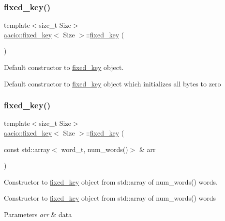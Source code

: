 \subsubsection{\texorpdfstring{fixed\+\_\+key()}{fixed\_key()}\hspace{0.1cm}{\footnotesize\ttfamily [3/4]}}
{\footnotesize\ttfamily template$<$size\+\_\+t Size$>$ \\
\mbox{\hyperlink{classaacio_1_1fixed__key}{aacio\+::fixed\+\_\+key}}$<$ Size $>$\+::\mbox{\hyperlink{classaacio_1_1fixed__key}{fixed\+\_\+key}} (\begin{DoxyParamCaption}{ }\end{DoxyParamCaption})\hspace{0.3cm}{\ttfamily [inline]}}



Default constructor to \mbox{\hyperlink{classaacio_1_1fixed__key}{fixed\+\_\+key}} object. 

Default constructor to \mbox{\hyperlink{classaacio_1_1fixed__key}{fixed\+\_\+key}} object which initializes all bytes to zero \mbox{\label{classaacio_1_1fixed__key_a8b7e40b2f57b0d95ed19e32a52b6abd9}} 
\subsubsection{\texorpdfstring{fixed\+\_\+key()}{fixed\_key()}\hspace{0.1cm}{\footnotesize\ttfamily [4/4]}}
{\footnotesize\ttfamily template$<$size\+\_\+t Size$>$ \\
\mbox{\hyperlink{classaacio_1_1fixed__key}{aacio\+::fixed\+\_\+key}}$<$ Size $>$\+::\mbox{\hyperlink{classaacio_1_1fixed__key}{fixed\+\_\+key}} (\begin{DoxyParamCaption}\item[{const std\+::array$<$ word\+\_\+t, num\+\_\+words()$>$ \&}]{arr }\end{DoxyParamCaption})\hspace{0.3cm}{\ttfamily [inline]}}



Constructor to \mbox{\hyperlink{classaacio_1_1fixed__key}{fixed\+\_\+key}} object from std\+::array of num\+\_\+words() words. 

Constructor to \mbox{\hyperlink{classaacio_1_1fixed__key}{fixed\+\_\+key}} object from std\+::array of num\+\_\+words() words 
\begin{DoxyParams}{Parameters}
{\em arr} & data \\
\hline
\end{DoxyParams}


